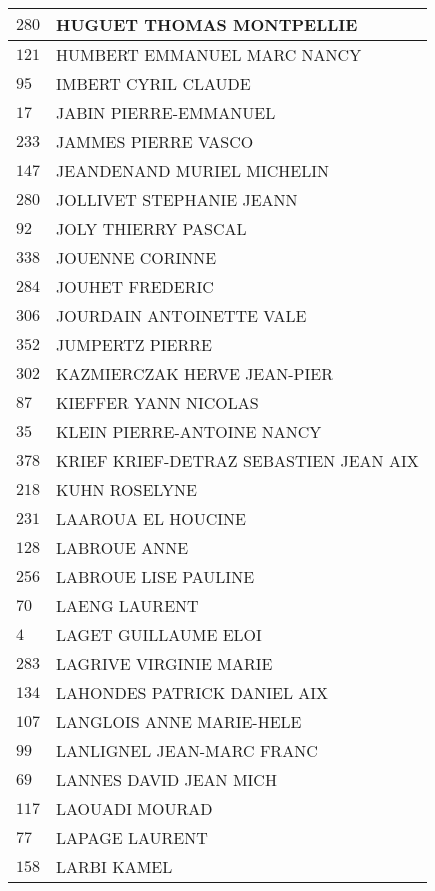 \begin{xltabular}{\linewidth}{|l|X|}
    \hline
    $280$ & HUGUET THOMAS MONTPELLIE \\
    \hline
    $121$ & HUMBERT EMMANUEL MARC NANCY \\
    \hline
    $95$ & IMBERT CYRIL CLAUDE \\
    \hline
    $17$ & JABIN PIERRE-EMMANUEL \\
    \hline
    $233$ & JAMMES PIERRE VASCO \\
    \hline
    $147$ & JEANDENAND MURIEL MICHELIN \\
    \hline
    $280$ & JOLLIVET STEPHANIE JEANN \\
    \hline
    $92$ & JOLY THIERRY PASCAL \\
    \hline
    $338$ & JOUENNE CORINNE \\
    \hline
    $284$ & JOUHET FREDERIC \\
    \hline
    $306$ & JOURDAIN ANTOINETTE VALE \\
    \hline
    $352$ & JUMPERTZ PIERRE \\
    \hline
    $302$ & KAZMIERCZAK HERVE JEAN-PIER \\
    \hline
    $87$ & KIEFFER YANN NICOLAS \\
    \hline
    $35$ & KLEIN PIERRE-ANTOINE NANCY \\
    \hline
    $378$ & KRIEF KRIEF-DETRAZ SEBASTIEN JEAN AIX \\
    \hline
    $218$ & KUHN ROSELYNE \\
    \hline
    $231$ & LAAROUA EL HOUCINE \\
    \hline
    $128$ & LABROUE ANNE \\
    \hline
    $256$ & LABROUE LISE PAULINE \\
    \hline
    $70$ & LAENG LAURENT \\
    \hline
    $4$ & LAGET GUILLAUME ELOI \\
    \hline
    $283$ & LAGRIVE VIRGINIE MARIE \\
    \hline
    $134$ & LAHONDES PATRICK DANIEL AIX \\
    \hline
    $107$ & LANGLOIS ANNE MARIE-HELE \\
    \hline
    $99$ & LANLIGNEL JEAN-MARC FRANC \\
    \hline
    $69$ & LANNES DAVID JEAN MICH \\
    \hline
    $117$ & LAOUADI MOURAD \\
    \hline
    $77$ & LAPAGE LAURENT \\
    \hline
    $158$ & LARBI KAMEL \\

\end{xltabular}
